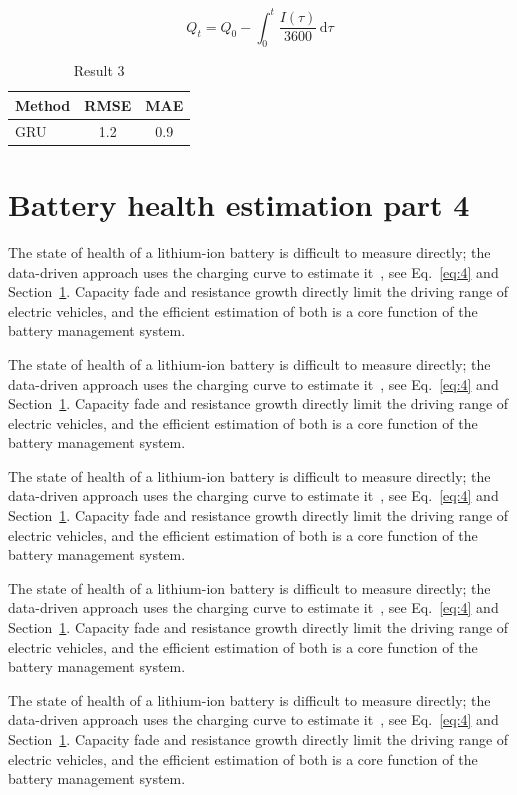 \documentclass[11pt]{article}
\begin{document}
\begin{equation}\label{eq:3}
  Q_t = Q_0 - \int_0^t \frac{I(\tau)}{3600}\,\mathrm{d}\tau
\end{equation}
\begin{table}[h]\centering\begin{tabular}{lcc}\toprule Method & RMSE & MAE\\\midrule GRU & 1.2 & 0.9\\\bottomrule\end{tabular}\caption{Result 3}\end{table}

\section{Battery health estimation part 4}\label{sec:4}
The state of health of a lithium-ion battery is difficult to measure directly; the data-driven approach uses the charging curve to estimate it~\cite{a2020}, see Eq.~\eqref{eq:4} and Section~\ref{sec:4}. Capacity fade and resistance growth directly limit the driving range of electric vehicles, and the efficient estimation of both is a core function of the battery management system.

The state of health of a lithium-ion battery is difficult to measure directly; the data-driven approach uses the charging curve to estimate it~\cite{a2020}, see Eq.~\eqref{eq:4} and Section~\ref{sec:4}. Capacity fade and resistance growth directly limit the driving range of electric vehicles, and the efficient estimation of both is a core function of the battery management system.

The state of health of a lithium-ion battery is difficult to measure directly; the data-driven approach uses the charging curve to estimate it~\cite{a2020}, see Eq.~\eqref{eq:4} and Section~\ref{sec:4}. Capacity fade and resistance growth directly limit the driving range of electric vehicles, and the efficient estimation of both is a core function of the battery management system.

The state of health of a lithium-ion battery is difficult to measure directly; the data-driven approach uses the charging curve to estimate it~\cite{a2020}, see Eq.~\eqref{eq:4} and Section~\ref{sec:4}. Capacity fade and resistance growth directly limit the driving range of electric vehicles, and the efficient estimation of both is a core function of the battery management system.

The state of health of a lithium-ion battery is difficult to measure directly; the data-driven approach uses the charging curve to estimate it~\cite{a2020}, see Eq.~\eqref{eq:4} and Section~\ref{sec:4}. Capacity fade and resistance growth directly limit the driving range of electric vehicles, and the efficient estimation of both is a core function of the battery management system.
\end{document}
